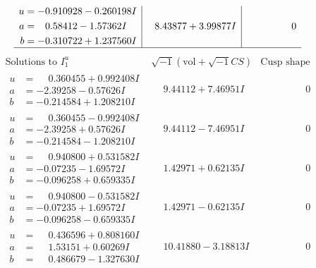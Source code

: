 \documentclass[1p]{elsarticle_modified}
\theoremstyle{definition}
\newcommand{\I}{\sqrt{-1}}
\begin{document}
$$\begin{array}{c|c|c}
\begin{aligned}
u &= -0.910928 - 0.260198 I \\
a &= \phantom{-}0.58412 - 1.57362 I \\
b &= -0.310722 + 1.237560 I\end{aligned}
 & \phantom{-}8.43877 + 3.99877 I & \phantom{-0.000000 } 0\\
 \hline 
 \end{array}$$\newpage$$\begin{array}{c|c|c}  
\text{Solutions to }I^u_{1}& \I (\text{vol} + \sqrt{-1}CS) & \text{Cusp shape}\\
 \hline 
\begin{aligned}
u &= \phantom{-}0.360455 + 0.992408 I \\
a &= -2.39258 - 0.57626 I \\
b &= -0.214584 + 1.208210 I\end{aligned}
 & \phantom{-}9.44112 + 7.46951 I & \phantom{-0.000000 } 0 \\ \hline\begin{aligned}
u &= \phantom{-}0.360455 - 0.992408 I \\
a &= -2.39258 + 0.57626 I \\
b &= -0.214584 - 1.208210 I\end{aligned}
 & \phantom{-}9.44112 - 7.46951 I & \phantom{-0.000000 } 0 \\ \hline\begin{aligned}
u &= \phantom{-}0.940800 + 0.531582 I \\
a &= -0.07235 - 1.69572 I \\
b &= -0.096258 + 0.659335 I\end{aligned}
 & \phantom{-}1.42971 + 0.62135 I & \phantom{-0.000000 } 0 \\ \hline\begin{aligned}
u &= \phantom{-}0.940800 - 0.531582 I \\
a &= -0.07235 + 1.69572 I \\
b &= -0.096258 - 0.659335 I\end{aligned}
 & \phantom{-}1.42971 - 0.62135 I & \phantom{-0.000000 } 0 \\ \hline\begin{aligned}
u &= \phantom{-}0.436596 + 0.808160 I \\
a &= \phantom{-}1.53151 + 0.60269 I \\
b &= \phantom{-}0.486679 - 1.327630 I\end{aligned}
 & \phantom{-}10.41880 - 3.18813 I & \phantom{-0.000000 } 0 \\ \hline\begin{aligned}

\end{aligned}
\end{array}$$
\end{document}
